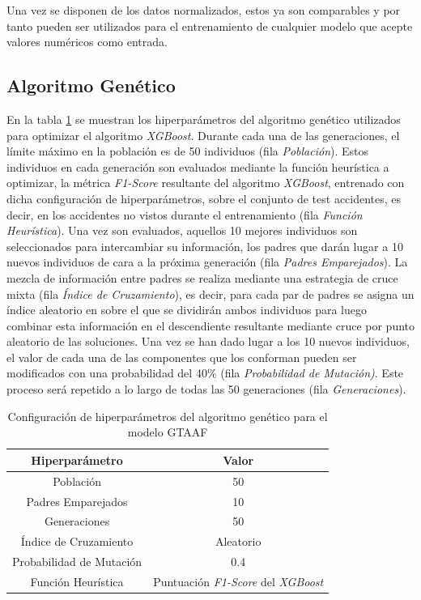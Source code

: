 Una vez se disponen de los datos normalizados, estos ya son comparables y por tanto pueden ser utilizados para el entrenamiento de cualquier modelo que acepte valores numéricos como entrada.


\subsection{Algoritmo Genético}


En la tabla \ref{GAHyperparametersSetup} se muestran los hiperparámetros del algoritmo genético utilizados para optimizar el algoritmo \textit{XGBoost}. Durante cada una de las generaciones, el límite máximo en la población es de 50 individuos (fila \textit{Población}). Estos individuos en cada generación son evaluados mediante la función heurística a optimizar, la métrica \textit{F1-Score} resultante del algoritmo \textit{XGBoost}, entrenado con dicha configuración de hiperparámetros, sobre el conjunto de test accidentes, es decir, en los accidentes no vistos durante el entrenamiento (fila \textit{Función Heurística}). Una vez son evaluados, aquellos 10 mejores individuos son seleccionados para intercambiar su información, los padres que darán lugar a 10 nuevos individuos de cara a la próxima generación (fila \textit{Padres Emparejados}). La mezcla de información entre padres se realiza mediante una estrategia de cruce mixta (fila \textit{Índice de Cruzamiento}), es decir, para cada par de padres se asigna un índice aleatorio en sobre el que se dividirán ambos individuos para luego combinar esta información en el descendiente resultante mediante cruce por punto aleatorio de las soluciones. Una vez se han dado lugar a los 10 nuevos individuos, el valor de cada una de las componentes que los conforman pueden ser modificados con una probabilidad del 40\% (fila \textit{Probabilidad de Mutación)}. Este proceso será repetido a lo largo de todas las 50 generaciones (fila \textit{Generaciones}).


\begin{table}[H]
	\caption{Configuración de hiperparámetros del algoritmo genético para el modelo GTAAF}
	\centering
	\begin{tabular}{|c|c|}
		\hline
		\textbf{Hiperparámetro} & \textbf{Valor} \\ \hline
		\hline
		Población     & 50 \\ \hline
		Padres Emparejados & 10 \\ \hline
		Generaciones    & 50 \\ \hline
		Índice de Cruzamiento & Aleatorio \\ \hline
		Probabilidad de Mutación & 0.4 \\ \hline
		Función Heurística & Puntuación \textit{F1-Score} del \textit{XGBoost} \\ \hline \hline
	\end{tabular}

	\label{GAHyperparametersSetup}
\end{table}

